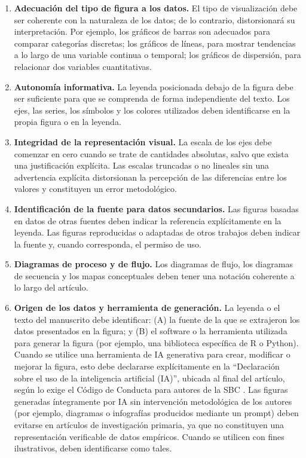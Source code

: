\documentclass[spanish]{rbie2026}%
\begin{document}
\begin{enumerate}
  \item \textbf{Adecuación del tipo de figura a los datos.} El tipo de visualización debe ser coherente con la naturaleza de los datos; de lo contrario, distorsionará su interpretación. Por ejemplo, los gráficos de barras son adecuados para comparar categorías discretas; los gráficos de líneas, para mostrar tendencias a lo largo de una variable continua o temporal; los gráficos de dispersión, para relacionar dos variables cuantitativas.

  \item \textbf{Autonomía informativa.} La leyenda posicionada debajo de la figura debe ser suficiente para que se comprenda de forma independiente del texto. Los ejes, las series, los símbolos y los colores utilizados deben identificarse en la propia figura o en la leyenda.

  \item \textbf{Integridad de la representación visual.} La escala de los ejes debe comenzar en cero cuando se trate de cantidades absolutas, salvo que exista una justificación explícita. Las escalas truncadas o no lineales sin una advertencia explícita distorsionan la percepción de las diferencias entre los valores y constituyen un error metodológico.

  \item \textbf{Identificación de la fuente para datos secundarios.} Las figuras basadas en datos de otras fuentes deben indicar la referencia explícitamente en la leyenda. Las figuras reproducidas o adaptadas de otros trabajos deben indicar la fuente y, cuando corresponda, el permiso de uso.

  \item \textbf{Diagramas de proceso y de flujo.} Los diagramas de flujo, los diagramas de secuencia y los mapas conceptuales deben tener una notación coherente a lo largo del artículo.

   \item \textbf{Origen de los datos y herramienta de generación.} La leyenda o el texto del manuscrito debe identificar: (A) la fuente de la que se extrajeron los datos presentados en la figura; y (B) el software o la herramienta utilizada para generar la figura (por ejemplo, una biblioteca específica de R o Python). Cuando se utilice una herramienta de IA generativa para crear, modificar o mejorar la figura, esto debe declararse explícitamente en la ``Declaración sobre el uso de la inteligencia artificial (IA)'', ubicada al final del artículo, según lo exige el Código de Conducta para autores de la SBC \citeyearpar{SBC2024conduta_pt}. Las figuras generadas íntegramente por IA sin intervención metodológica de los autores (por ejemplo, diagramas o infografías producidos mediante un prompt) deben evitarse en artículos de investigación primaria, ya que no constituyen una representación verificable de datos empíricos. Cuando se utilicen con fines ilustrativos, deben identificarse como tales.


\end{enumerate}
\end{document}
